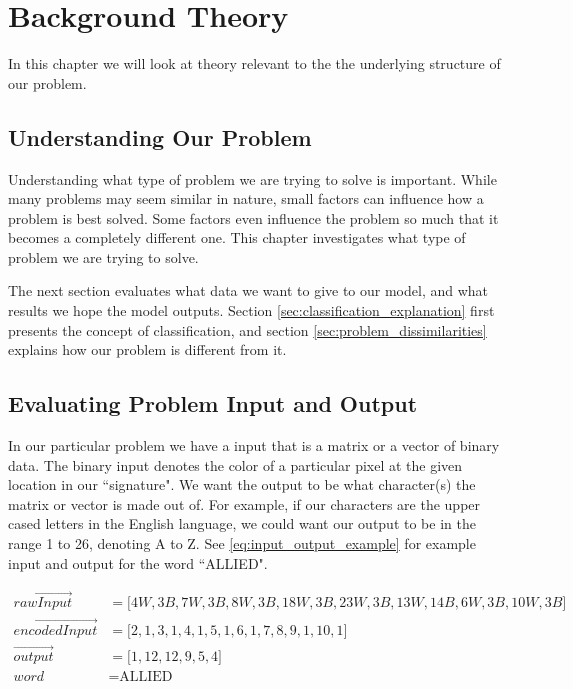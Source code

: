 
\chapter{Background Theory}
\label{ch:background}
In this chapter we will look at theory relevant to the the underlying structure of our problem.


\section{Understanding Our Problem}
Understanding what type of problem we are trying to solve is important. While many problems may seem similar in nature, small factors can influence how a problem is best solved. Some factors even influence the problem so much that it becomes a completely different one. This chapter investigates what type of problem we are trying to solve.

The next section evaluates what data we want to give to our model, and what results we hope the model outputs. Section \ref{sec:classification_explanation} first presents the concept of classification, and section \ref{sec:problem_dissimilarities} explains how our problem is different from it.


\section{Evaluating Problem Input and Output}
In our particular problem we have a input that is a matrix or a vector of binary data. The binary input denotes the color of a particular pixel at the given location in our ``signature". We want the output to be what character(s) the matrix or vector is made out of. For example, if our characters are the upper cased letters in the English language, we could want our output to be in the range 1 to 26, denoting A to Z. See \ref{eq:input_output_example} for example input and output for the word ``ALLIED".

\begin{equation}
    \label{eq:input_output_example}
    \begin{aligned}
       \vec{rawInput}        &= \lbrack 4W, 3B, 7W, 3B, 8W, 3B, 18W, 3B, 23W, 3B, 13W, 14B, 6W, 3B, 10W, 3B \rbrack \\
       \vec{encodedInput}    &= \lbrack 2, 1, 3, 1, 4, 1, 5, 1, 6, 1, 7, 8, 9, 1, 10, 1 \rbrack \\
       \vec{output}          &= \lbrack 1, 12, 12, 9, 5, 4 \rbrack \\
       word                  &= \text{ALLIED}
    \end{aligned}
\end{equation}

